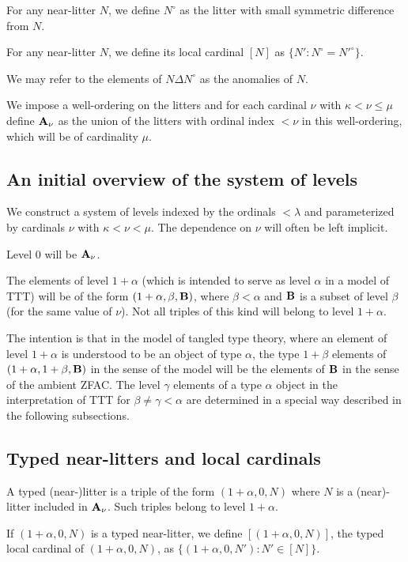 \documentclass[12pt]{article}
\begin{document}
For any near-litter $N$, we define $N^\circ$ as the litter with small symmetric difference from $N$.

For any near-litter $N$, we define its local cardinal $[N]$ as $\{N':N^{\circ} = N'^{\circ}\}$.

We may refer to the elements of $N \Delta N^{\circ}$ as the anomalies of $N$.

We impose a well-ordering on the litters and for each cardinal $\nu$ with $\kappa<\nu \leq \mu$  define ${\bf A}_\nu$ as the union of the litters with ordinal index $<\nu$ in this well-ordering, which will be of cardinality $\mu$.

\subsection{An initial overview of the system of levels}

We construct a system of levels indexed by the ordinals $<\lambda$ and parameterized by cardinals $\nu$ with $\kappa<\nu<\mu$.  The dependence on $\nu$ will often be left implicit.

Level 0 will be ${\bf A}_\nu$.

The elements of level $1+\alpha$ (which is intended to serve as level $\alpha$ in a model of TTT) will be of the form $(1+\alpha,\beta,{\bf B})$, where $\beta<\alpha$
and ${\bf B}$ is a subset of level $\beta$ (for the same value of $\nu$).  Not all triples of this kind will belong to level $1+\alpha$.

The intention is that in the model of tangled type theory, where an element of level $1+\alpha$ is understood to be an object of type $\alpha$, the type $1+\beta$ elements of
$(1+\alpha,1+\beta,{\bf B})$ in the sense of the model will be the elements of ${\bf B}$ in the sense of the ambient ZFAC.  The level $\gamma$ elements of a type $\alpha$ object in the interpretation of TTT for $\beta \neq \gamma <\alpha$ are determined in a special way described in the following subsections.

\subsection{Typed near-litters and local cardinals}

A typed (near-)litter is a triple of the form $(1+\alpha,0,N)$ where $N$ is a (near)-litter included in ${\bf A}_\nu$.  Such triples belong to level $1+\alpha$.

If $(1+\alpha,0,N)$ is a typed near-litter, we define $[(1+\alpha,0,N)]$, the typed local cardinal of $(1+\alpha,0,N)$, as $\{(1+\alpha,0,N'):N' \in [N]\}$.
\end{document}
